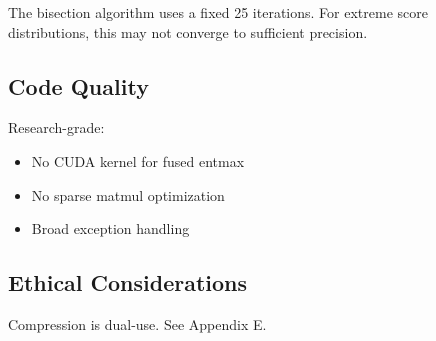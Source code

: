 The bisection algorithm uses a fixed 25 iterations. For extreme score 
distributions, this may not converge to sufficient precision.

\subsection{Code Quality}

Research-grade:
\begin{itemize}
\item No CUDA kernel for fused entmax
\item No sparse matmul optimization
\item Broad exception handling

\end{itemize}
\subsection{Ethical Considerations}

Compression is dual-use. See Appendix E.